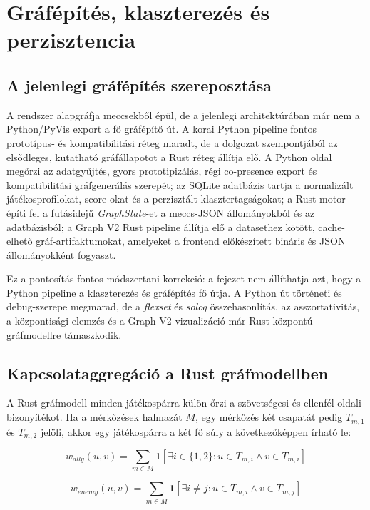 \chapter{Gráfépítés, klaszterezés és perzisztencia}

\section{A jelenlegi gráfépítés szereposztása}

A rendszer alapgráfja meccsekből épül, de a jelenlegi architektúrában már nem a Python/PyVis export a fő gráfépítő út. A korai Python pipeline fontos prototípus- és kompatibilitási réteg maradt, de a dolgozat szempontjából az elsődleges, kutatható gráfállapotot a Rust réteg állítja elő. A Python oldal megőrzi az adatgyűjtés, gyors prototipizálás, régi co-presence export és kompatibilitási gráfgenerálás szerepét; az SQLite adatbázis tartja a normalizált játékosprofilokat, score-okat és a perzisztált klasztertagságokat; a Rust motor építi fel a futásidejű \textit{GraphState}-et a meccs-JSON állományokból és az adatbázisból; a Graph V2 Rust pipeline állítja elő a datasethez kötött, cache-elhető gráf-artifaktumokat, amelyeket a frontend előkészített bináris és JSON állományokként fogyaszt.

Ez a pontosítás fontos módszertani korrekció: a fejezet nem állíthatja azt, hogy a Python pipeline a klaszterezés és gráfépítés fő útja. A Python út történeti és debug-szerepe megmarad, de a \textit{flexset} és \textit{soloq} összehasonlítás, az asszortativitás, a központisági elemzés és a Graph V2 vizualizáció már Rust-központú gráfmodellre támaszkodik.

\section{Kapcsolataggregáció a Rust gráfmodellben}

A Rust gráfmodell minden játékospárra külön őrzi a szövetségesi és ellenfél-oldali bizonyítékot. Ha a mérkőzések halmazát $M$, egy mérkőzés két csapatát pedig $T_{m,1}$ és $T_{m,2}$ jelöli, akkor egy játékospárra a két fő súly a következőképpen írható le:

\begin{equation}
w_{ally}(u,v)=\sum_{m \in M}\mathbf{1}[\exists i \in \{1,2\}: u \in T_{m,i} \land v \in T_{m,i}]
\end{equation}

\begin{equation}
w_{enemy}(u,v)=\sum_{m \in M}\mathbf{1}[\exists i \neq j: u \in T_{m,i} \land v \in T_{m,j}]
\end{equation}

